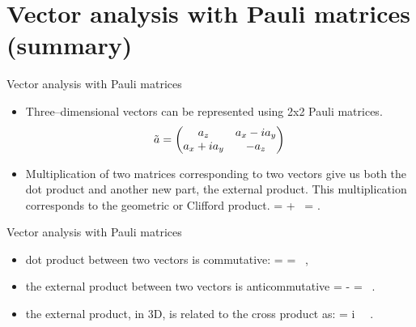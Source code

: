 \documentclass[10pt]{beamer}
\begin{document}

\section{Vector analysis with Pauli matrices (summary)}

\begin{frame}[fragile]{Vector analysis with Pauli matrices}
\begin{itemize}
\item Three--dimensional vectors can be represented using 2x2 Pauli matrices.
%
\begin {equation}
\tilde{a} =  \begin{pmatrix}a_z & a_x - i a_y \cr a_x + i a_y & -a_z\end{pmatrix}\,
\label{Epauli}
 \end{equation}
\item Multiplication of two matrices corresponding to two vectors give us both the dot product and another new part, the external product. \alert{This multiplication corresponds to the geometric or Clifford product.
%
\be \label{funids}
\Ba  \Bb =  \Ba \cdot \Bb + \Ba \wedge \Bb \, = \ta \tb.
\ee
%
}
\end{itemize}
\end{frame}

\begin{frame}[fragile]{Vector analysis with Pauli matrices}
\begin{itemize}
\item \alert{dot product} between two vectors \alert{is commutative}: 
%
\be \label{intdef}
\Ba \cdot \Bb = \Bb \cdot \Ba =  \, ,
\ee
%
\item \alert{the external product} between two vectors \alert{is anticommutative}
%
\be \label{extdef}
\Ba \wedge \Bb = - \Bb \wedge \Ba = \, .
\ee
%
\item the external product, in 3D, is related to the cross product as:
%
\be \label{epcross3}
\Ba \wedge \Bb =  i \, \Ba \times \Bb \, .
\ee
%
\end{itemize}

\end{frame}
\end{document}
